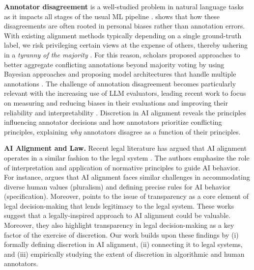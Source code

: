 \noindent \textbf{Annotator disagreement} is a well-studied problem in natural language tasks \cite{sandri-etal-2023-dont, wang2024aligninglanguagemodelshuman, Cabitza_2023} as it impacts all stages of the usual ML pipeline \cite{plank-2022-problem}. \cite{zhang2024divergingpreferencesannotatorsdisagree} shows that how these disagreements are often rooted in personal biases rather than annotation errors. With existing alignment methods typically depending on a single ground-truth label, we risk privileging certain views at the expense of others, thereby ushering in a \emph{tyranny of the majority} \cite{feffer2023moralmachinetyrannymajority}.
For this reason, scholars proposed approaches to better aggregate conflicting annotations beyond majority voting by using Bayesian approaches \cite{paun-etal-2018-comparing} and proposing model architectures that handle multiple annotations \cite{davani-etal-2022-dealing}.
The challenge of annotation disagreement becomes particularly relevant with the increasing use of LLM evaluators, leading recent work to focus on measuring and reducing biases in their evaluations \cite{liu2024aligning, wu2023stylesubstanceevaluationbiases} and improving their reliability and interpretability \cite{li2024decompose}. Discretion in AI alignment reveals the principles influencing annotator decisions and how annotators prioritize conflicting principles, explaining \emph{why} annotators disagree as a function of their principles. 



\noindent \textbf{AI Alignment and Law.} Recent legal literature has argued that AI alignment operates in a similar fashion to the legal system \cite{caputo2024alignment,abiri2024public,nay2024law}. The authors emphasize the role of interpretation and application of normative principles to guide AI behavior. For instance, \cite{caputo2024alignment} argues that AI alignment faces similar challenges in accommodating diverse human values (pluralism) and defining precise rules for AI behavior (specification). Moreover, \cite{abiri2024public} points to the issue of transparency as a core element of legal decision-making that lends legitimacy to the legal system.
These works suggest that a legally-inspired approach to AI alignment could be valuable. Moreover, they also highlight transparency in legal decision-making as a key factor of the exercise of discretion.
Our work builds upon these findings by (i) formally defining discretion in AI alignment, (ii) connecting it to legal systems, and (iii) empirically studying the extent of discretion in algorithmic and human annotators.